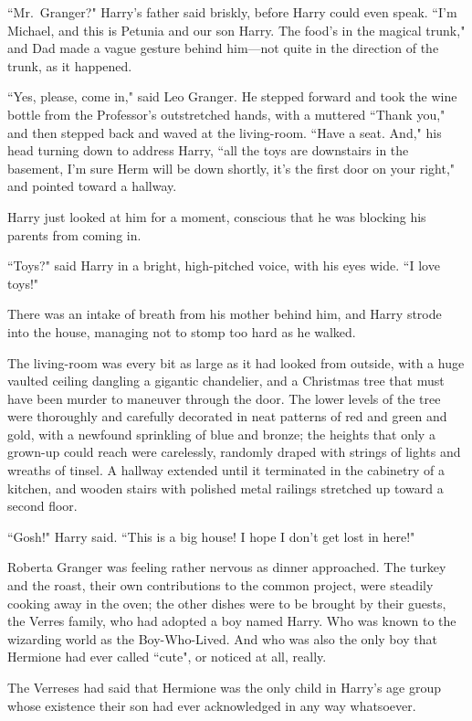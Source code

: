 ``Mr.~Granger?" Harry's father said briskly, before Harry could even speak. ``I'm Michael, and this is Petunia and our son Harry. The food's in the magical trunk," and Dad made a vague gesture behind him---not quite in the direction of the trunk, as it happened.

``Yes, please, come in," said Leo Granger. He stepped forward and took the wine bottle from the Professor's outstretched hands, with a muttered ``Thank you," and then stepped back and waved at the living-room. ``Have a seat. And," his head turning down to address Harry, ``all the toys are downstairs in the basement, I'm sure Herm will be down shortly, it's the first door on your right," and pointed toward a hallway.

Harry just looked at him for a moment, conscious that he was blocking his parents from coming in.

``Toys?" said Harry in a bright, high-pitched voice, with his eyes wide. ``I love toys!"

There was an intake of breath from his mother behind him, and Harry strode into the house, managing not to stomp too hard as he walked.

The living-room was every bit as large as it had looked from outside, with a huge vaulted ceiling dangling a gigantic chandelier, and a Christmas tree that must have been murder to maneuver through the door. The lower levels of the tree were thoroughly and carefully decorated in neat patterns of red and green and gold, with a newfound sprinkling of blue and bronze; the heights that only a grown-up could reach were carelessly, randomly draped with strings of lights and wreaths of tinsel. A hallway extended until it terminated in the cabinetry of a kitchen, and wooden stairs with polished metal railings stretched up toward a second floor.

``Gosh!" Harry said. ``This is a big house! I hope I don't get lost in here!"

\later

Roberta Granger was feeling rather nervous as dinner approached. The turkey and the roast, their own contributions to the common project, were steadily cooking away in the oven; the other dishes were to be brought by their guests, the Verres family, who had adopted a boy named Harry. Who was known to the wizarding world as the Boy-Who-Lived. And who was also the only boy that Hermione had ever called ``cute", or noticed at all, really.

The Verreses had said that Hermione was the only child in Harry's age group whose existence their son had ever acknowledged in any way whatsoever.

